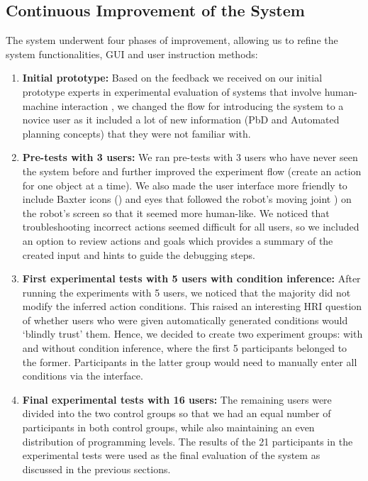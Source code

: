 \subsection{Continuous Improvement of the System}
The system underwent four phases of improvement, allowing us to refine the system functionalities, GUI and user instruction methods:
\begin{enumerate}
	\item {\textbf{Initial prototype:}
		Based on the feedback we received on our initial prototype experts in experimental evaluation of systems that involve human-machine interaction \cite{mandran2018traceable}, we changed the flow for introducing the system to a novice user as it included a lot of new information (\eg PbD and Automated planning concepts) that they were not familiar with.
	}
	\item {\textbf{Pre-tests with 3 users:}
		We ran pre-tests with 3 users who have never seen the system before and further improved the experiment flow (\eg create an action for one object at a time).
		We also made the user interface more friendly to include Baxter icons () and eyes that followed the robot's moving joint \cite{baxtereyes}) on the robot's screen so that it seemed more human-like.
		We noticed that troubleshooting incorrect actions seemed difficult for all users, so we included an option to review actions and goals which provides a summary of the created input and hints to guide the debugging steps.}
	\item {\textbf{First experimental tests with 5 users with condition inference:}
		After running the experiments with 5 users, we noticed that the majority did not modify the inferred action conditions.
		This raised an interesting HRI question of whether users who were given automatically generated conditions would `blindly trust' them.
		Hence, we decided to create two experiment groups: with and without condition inference, where the first 5 participants belonged to the former.
		Participants in the latter group would need to manually enter all conditions via the interface. }
	\item {\textbf{Final experimental tests with 16 users:}
		The remaining users were divided into the two control groups so that we had an equal number of participants in both control groups, while also maintaining an even distribution of programming levels.
		The results of the 21 participants in the experimental tests were used as the final evaluation of the system as discussed in the previous sections.
	}
\end{enumerate}

